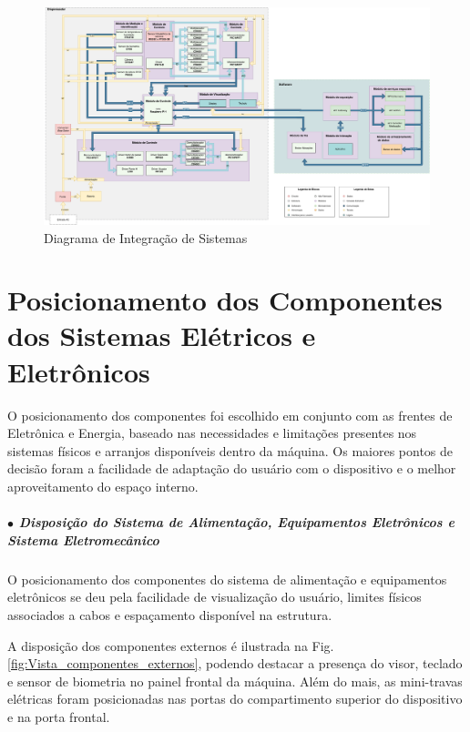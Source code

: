 \begin{landscape}
\begin{figure}[!htb]
    \centering
    \vspace{1cm}
    \hspace{-2cm}
    \includegraphics[width=1.5\textwidth, height=2\textheight,keepaspectratio]{figuras/integracao/integracao_geral.pdf}
    \vspace{-5pt}
    \caption{Diagrama de Integração de Sistemas}
    \label{fig:arq_integracao}
\end{figure}
\end{landscape}


\section{Posicionamento dos Componentes dos Sistemas Elétricos e Eletrônicos}
\label{pos_compontes}

O posicionamento dos componentes foi escolhido em conjunto com as frentes de Eletrônica e Energia, baseado nas necessidades e limitações presentes nos sistemas físicos e arranjos disponíveis dentro da máquina. Os maiores pontos de decisão foram a facilidade de adaptação do usuário com o dispositivo e o melhor aproveitamento do espaço interno.

\subparagraph*{$\bullet$ Disposição do Sistema de Alimentação, Equipamentos Eletrônicos e Sistema Eletromecânico} \hfill

O posicionamento dos componentes do sistema de alimentação e equipamentos eletrônicos se deu pela facilidade de visualização do usuário, limites físicos associados a cabos e espaçamento disponível na estrutura.  

A disposição dos componentes externos é ilustrada na Fig. \ref{fig:Vista_componentes_externos}, podendo destacar a presença do visor, teclado e sensor de biometria no painel frontal da máquina. Além do mais, as mini-travas elétricas foram posicionadas nas portas do compartimento superior do dispositivo e na porta frontal.

